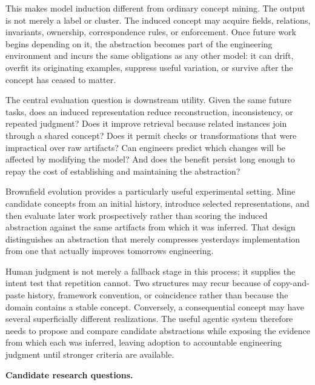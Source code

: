 This makes model induction different from ordinary concept mining. The output is not merely a label or cluster. The induced concept may acquire fields, relations, invariants, ownership, correspondence rules, or enforcement. Once future work begins depending on it, the abstraction becomes part of the engineering environment and incurs the same obligations as any other model: it can drift, overfit its originating examples, suppress useful variation, or survive after the concept has ceased to matter.

The central evaluation question is downstream utility. Given the same future tasks, does an induced representation reduce reconstruction, inconsistency, or repeated judgment? Does it improve retrieval because related instances join through a shared concept? Does it permit checks or transformations that were impractical over raw artifacts? Can engineers predict which changes will be affected by modifying the model? And does the benefit persist long enough to repay the cost of establishing and maintaining the abstraction?

Brownfield evolution provides a particularly useful experimental setting. Mine candidate concepts from an initial history, introduce selected representations, and then evaluate later work prospectively rather than scoring the induced abstraction against the same artifacts from which it was inferred. That design distinguishes an abstraction that merely compresses yesterday\textquotesingle s implementation from one that actually improves tomorrow\textquotesingle s engineering.

Human judgment is not merely a fallback stage in this process; it supplies the intent test that repetition cannot. Two structures may recur because of copy-and-paste history, framework convention, or coincidence rather than because the domain contains a stable concept. Conversely, a consequential concept may have several superficially different realizations. The useful agentic system therefore needs to propose and compare candidate abstractions while exposing the evidence from which each was inferred, leaving adoption to accountable engineering judgment until stronger criteria are available.

\textbf{Candidate research questions.}

